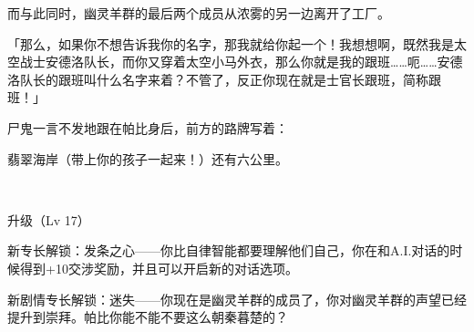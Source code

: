 而与此同时，幽灵羊群的最后两个成员从浓雾的另一边离开了工厂。

「那么，如果你不想告诉我你的名字，那我就给你起一个！我想想啊，既然我是太空战士安德洛队长，而你又穿着太空小马外衣，那么你就是我的跟班……呃……安德洛队长的跟班叫什么名字来着？不管了，反正你现在就是士官长跟班，简称跟班！」

尸鬼一言不发地跟在帕比身后，前方的路牌写着：

\begin{center}
翡翠海岸（带上你的孩子一起来！）还有六公里。    
\end{center}


~\vfill

\begin{note}
    升级（Lv 17）

    新专长解锁：发条之心——你比自律智能都要理解他们自己，你在和A.I.对话的时候得到+10交涉奖励，并且可以开启新的对话选项。

    新剧情专长解锁：迷失——你现在是幽灵羊群的成员了，你对幽灵羊群的声望已经提升到崇拜。帕比你能不能不要这么朝秦暮楚的？
\end{note}




